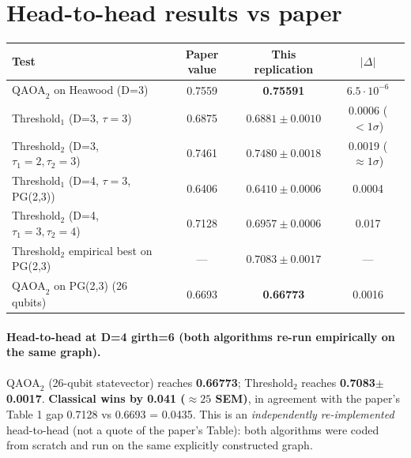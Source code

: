 \documentclass[11pt]{article}
\begin{document}
\section{Head-to-head results vs paper}
\begin{center}\small
\begin{tabular}{lccc}
\toprule
Test & Paper value & This replication & $|\Delta|$ \\
\midrule
$\text{QAOA}_2$ on Heawood (D=3)        & 0.7559  & \textbf{0.75591}          & $6.5\!\cdot\!10^{-6}$ \\
Threshold$_1$ (D=3, $\tau{=}3$)         & 0.6875  & $0.6881\pm0.0010$          & 0.0006 ($<1\sigma$) \\
Threshold$_2$ (D=3, $\tau_1{=}2,\tau_2{=}3$) & 0.7461 & $0.7480\pm0.0018$      & 0.0019 ($\approx 1\sigma$) \\
Threshold$_1$ (D=4, $\tau{=}3$, PG(2,3))& 0.6406  & $0.6410\pm0.0006$          & 0.0004 \\
Threshold$_2$ (D=4, $\tau_1{=}3,\tau_2{=}4$) & 0.7128 & $0.6957\pm0.0006$      & 0.017 \\
Threshold$_2$ empirical best on PG(2,3) & ---     & $0.7083\pm0.0017$          & --- \\
$\text{QAOA}_2$ on PG(2,3) (26 qubits)  & 0.6693 & \textbf{0.66773}            & 0.0016 \\
\bottomrule
\end{tabular}
\end{center}

\paragraph{Head-to-head at D=4 girth=6 (both algorithms re-run empirically on the same graph).}
$\text{QAOA}_2$ (26-qubit statevector) reaches \textbf{0.66773}; Threshold$_2$ reaches \textbf{0.7083$\pm$0.0017}. \textbf{Classical wins by 0.041 ($\approx 25$ SEM)}, in agreement with the paper's Table 1 gap 0.7128 vs 0.6693 = 0.0435. This is an \emph{independently re-implemented} head-to-head (not a quote of the paper's Table): both algorithms were coded from scratch and run on the same explicitly constructed graph.
\end{document}
